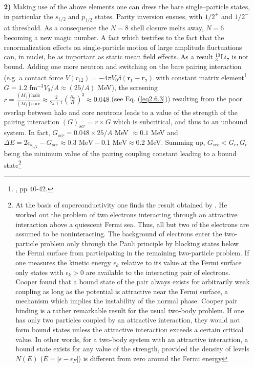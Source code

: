 \textbf{2)} Making use of the above elements one can dress the bare single--particle states, in particular the $s_{1/2}$ and $p_{1/2}$ states. Parity inversion ensues, with $1/2^+$ and $1/2^-$ at threshold. As a consequence the $N=8$ shell closure melts away, $N=6$ becoming a new magic number. A fact which testifies to the fact that the renormalization effects on single-particle motion of  large amplitude fluctuations can,  in nuclei, be as important as static mean field effects. As a result $^{10}_3$Li$_7$ is not bound. Adding one more neutron and switching on the bare pairing interaction (e.g. a contact force $V(r_{12})=-4\pi V_0\delta(\mathbf r_1-\mathbf r_2)$ with constant matrix element\footnote{\cite{Brink:05}, pp 40-42.} $G=1.2$ fm$^{-3}V_0/A\approx (25/A)$ MeV), the screening  $r=\frac{(M_j)\text{halo}}{(M_j)\text{core}}\approx \frac{2}{2j+1}\left(\frac{R_0}{R}\right)^3\approx 0.048$ (see Eq. (\ref{eq2.6.3})) resulting from the poor overlap between halo and core neutrons leads to  a value of the strength of the pairing interaction $(G)_{scr}=r\times G$ which is subcritical, and thus to  an unbound system. In fact, $G_{scr}=0.048\times25/A$ MeV $\approx0.1$ MeV and $\Delta E=2\tilde\epsilon_{s_{1/2}}-G_{scr}\approx0.3\text{ MeV}-0.1\text{ MeV}\approx 0.2$ MeV. Summing up, $G_{scr}<G_c, G_c$ being the minimum value of the pairing coupling constant leading to a bound state\footnote{At the basis of superconductivity one finds the result obtained by \cite{Cooper:56}. He worked out the problem of two electrons interacting through an attractive interaction above a quiescent Fermi sea. Thus, all but two of the electrons are assumed to be noninteracting. The background of electrons enter the two-particle problem only through the Pauli principle by blocking states below the Fermi surface from participating in the remaining two-particle problem. If one measures the kinetic energy $\epsilon_k$ relative to its value at the Fermi surface only states with $\epsilon_k>0$ are available to the interacting pair of electrons. Cooper found that a bound state of the pair always exists for arbitrarily weak coupling as long as the potential is attractive near the Fermi surface, a mechanism which implies the instability of the normal phase. Cooper pair binding is a rather remarkable result for the usual two-body problem. If one has only two particles coupled by an attractive interaction, they would not form bound states unless the attractive interaction exceeds a certain critical value. In other words, for a two-body system with an attractive interaction, a bound state exists for any value of the strength, provided the density of levels $N(E)$ ($E=|\epsilon-\epsilon_F|$) is different from zero around the Fermi energy 
}
